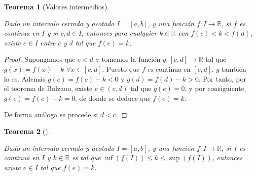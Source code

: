 \documentclass[
  a4paper,
]{scrreport}
\theoremstyle{definition}
\theoremstyle{plain}
\newtheorem{theorem}{Teorema}[chapter]
\theoremstyle{plain}
\theoremstyle{definition}
\theoremstyle{definition}
\theoremstyle{plain}
\theoremstyle{remark}
\begin{document}
\begin{theorem}[Valores
intermedios]\protect\hypertarget{thm-valores-intermedios}{}\label{thm-valores-intermedios}

Dado un intervalo cerrado y acotado \(I=[a,b]\), y una función
\(f:I\to\mathbb{R}\), si \(f\) es continua en \(I\) y si \(c,d\in I\),
entonces para cualquier \(k\in\mathbb{R}\) con \(f(c)<k<f(d)\), existe
\(e\in I\) entre \(c\) y \(d\) tal que \(f(e)=k\).

\end{theorem}

\begin{tcolorbox}[enhanced jigsaw, breakable, title=\textcolor{quarto-callout-note-color}{\faInfo}\hspace{0.5em}{Demostración}, toprule=.15mm, coltitle=black, arc=.35mm, rightrule=.15mm, colframe=quarto-callout-note-color-frame, colbacktitle=quarto-callout-note-color!10!white, toptitle=1mm, titlerule=0mm, leftrule=.75mm, opacityback=0, colback=white, bottomrule=.15mm, bottomtitle=1mm, left=2mm, opacitybacktitle=0.6]

\begin{proof}

Supongamos que \(c<d\) y tomemos la función \(g:[c,d]\to\mathbb{R}\) tal
que \(g(x)=f(x)-k\) \(\forall x\in[c,d]\). Puesto que \(f\) es continua
en \([c,d]\), \(g\) también lo es. Además \(g(c)=f(c)-k<0\) y
\(g(d)=f(d)-k>0\). Por tanto, por el teorema de Bolzano, existe
\(e\in(c,d)\) tal que \(g(e)=0\), y por consiguiente, \(g(e)=f(e)-k=0\),
de donde se deduce que \(f(e)=k\).

De forma análoga se procede si \(d<c\).

\end{proof}

\end{tcolorbox}

\begin{theorem}[]\protect\hypertarget{thm-valores-intermedios}{}\label{thm-valores-intermedios}

Dado un intervalo cerrado y acotado \(I=[a,b]\), y una función
\(f:I\to\mathbb{R}\), si \(f\) es continua en \(I\) y \(k\in\mathbb{R}\)
es tal que \(\inf(f(I))\leq k\leq \sup(f(I))\), entonces existe
\(e\in I\) tal que \(f(e)=k\).

\end{theorem}
\end{document}
